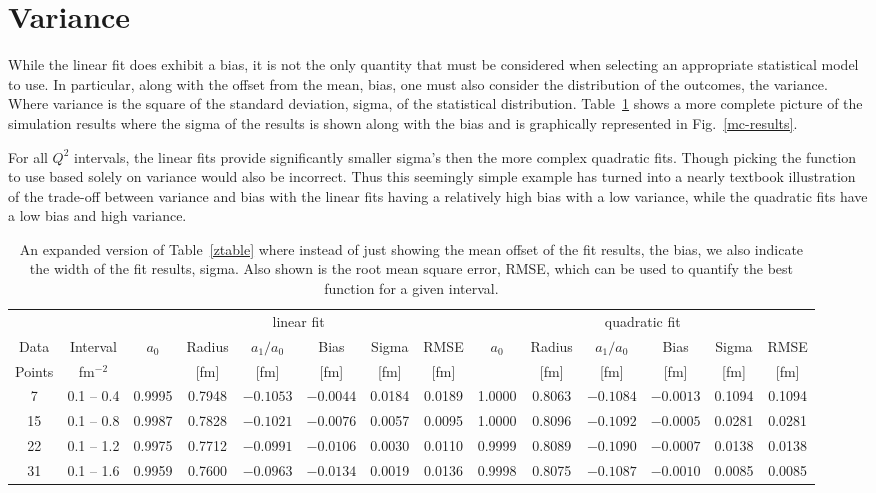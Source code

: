 \documentclass[10pt,superscriptaddress,aps,prc,twocolumn]{revtex4-1}
\begin{document}
\section{Variance}

While the linear fit does exhibit a bias, it is not the only quantity that must
be considered when selecting an appropriate statistical model to use.
In particular, along with the offset from the mean, bias, one must also consider the 
distribution of the outcomes, the variance.   Where variance is the square of
the standard deviation, sigma, of the statistical distribution.
Table~\ref{fulltable} shows a more complete picture of the simulation results 
where the sigma of the results is shown along with the bias and is
graphically represented in Fig.~\ref{mc-results}. 

For all $Q^2$ intervals, the linear fits provide significantly smaller sigma's
then the more complex quadratic fits.     Though picking the function to use
based solely on variance would also be incorrect.  
Thus this seemingly simple example has turned into a nearly textbook illustration 
of the trade-off between variance and bias with the linear fits having a relatively 
high bias with a low variance, while the quadratic fits have a low bias and high variance.

\begin{table}
\caption{An expanded version of Table~\ref{ztable} where instead of just showing the mean offset of the 
fit results, the bias, we also indicate the width of the fit results, sigma.   Also shown is the
root mean square error, RMSE, which can be used to quantify the best function for a given interval.}
\begin{tabular}{cc|cccccc|cccccc} \hline
       &           & \multicolumn{6}{c|}{linear fit}                       & \multicolumn{6}{c}{quadratic fit}                    \\ 
Data   & Interval  & $a_0$ & Radius &  $a_1/a_0$ &  Bias  & Sigma &  RMSE  & $a_0$ & Radius & $a_1/a_0$ &  Bias & Sigma &  RMSE \\  
Points & fm$^{-2}$ &       & [fm]   &   [fm]     & [fm]   &  [fm] &  [fm]  &       & [fm]   &  [fm]     & [fm]  &  [fm] &  [fm] \\  \hline
7      & 0.1 -- 0.4 & 0.9995& 0.7948& $-0.1053$& $-0.0044$& 0.0184& 0.0189 & 1.0000& 0.8063& $-0.1084$& $-0.0013$& 0.1094& 0.1094\\
15     & 0.1 -- 0.8 & 0.9987& 0.7828& $-0.1021$& $-0.0076$& 0.0057& 0.0095 & 1.0000& 0.8096& $-0.1092$& $-0.0005$& 0.0281& 0.0281\\
22     & 0.1 -- 1.2 & 0.9975& 0.7712& $-0.0991$& $-0.0106$& 0.0030& 0.0110 & 0.9999& 0.8089& $-0.1090$& $-0.0007$& 0.0138& 0.0138\\
31     & 0.1 -- 1.6 & 0.9959& 0.7600& $-0.0963$& $-0.0134$& 0.0019& 0.0136 & 0.9998& 0.8075& $-0.1087$& $-0.0010$& 0.0085& 0.0085\\ \hline
\end{tabular}
\label{fulltable}
\end{table}
\end{document}
